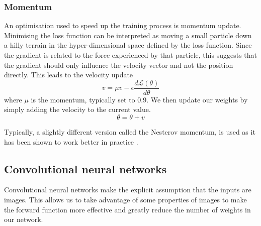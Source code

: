 \documentclass[12pt,a4paper,twoside,openright]{report}
\begin{document}
\subsubsection{Momentum}
An optimisation used to speed up the training process is momentum update. Minimising the loss function can be interpreted as moving a small particle down a hilly terrain in the hyper-dimensional space defined by the loss function. Since the gradient is related to the force experienced by that particle, this suggests that the gradient should only influence the velocity vector and not the position directly. This leads to the velocity update
\begin{equation}
	v = \mu  v - \epsilon \frac{d\mathcal{L}(\theta)}{d\theta}
\end{equation}
where $\mu$ is the momentum, typically set to 0.9. We then update our weights by simply adding the velocity to the current value.
\begin{equation}
	\theta = \theta + v
\end{equation}

Typically, a slightly different version called the Nesterov momentum, is used as it has been shown to work better in practice \cite{nesterov_momentum}.

\subsection{Convolutional neural networks}
Convolutional neural networks make the explicit assumption that the inputs are images. This allows us to take advantage of some properties of images to make the forward function more effective and greatly reduce the number of weights in our network. 
\end{document}
